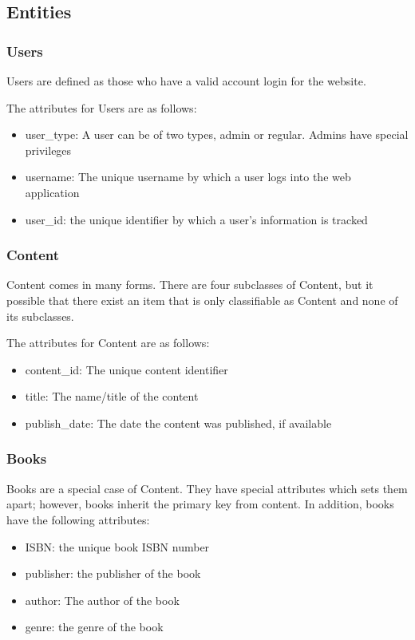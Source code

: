 \documentclass[letter, 12pt, titlepage]{article}
\begin{document}
	\subsection{Entities}
		\subsubsection{Users}
			Users are defined as those who have a valid account login for the website.

			The attributes for Users are as follows:
			\begin{itemize}
				\item user\_type: A user can be of two types, admin or regular. Admins have special privileges
				\item username: The unique username by which a user logs into the web application
				\item user\_id: the unique identifier by which a user's information is tracked
			\end{itemize}
		\subsubsection{Content}
			Content comes in many forms. There are four subclasses of Content, but it possible that there exist an item that is only classifiable as Content and none of its subclasses. 
			
			The attributes for Content are as follows:
			\begin{itemize}
				\item content\_id: The unique content identifier
				\item title: The name/title of the content
				\item publish\_date: The date the content was published, if available
			\end{itemize}
		\subsubsection{Books}
			Books are a special case of Content. They have special attributes which sets them apart; however, books inherit the primary key from content. In addition, books have the following attributes:
			\begin{itemize}
				\item ISBN: the unique book ISBN number
				\item publisher: the publisher of the book
				\item author: The author of the book
				\item genre: the genre of the book
			\end{itemize}
\end{document}
